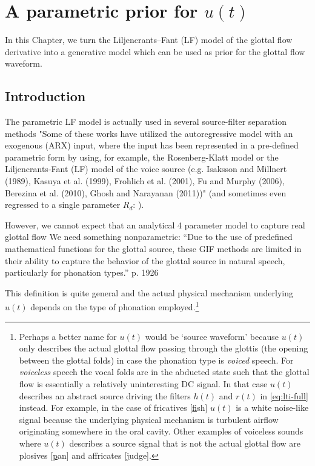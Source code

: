 \chapter{A parametric prior for $u(t)$\label{chapter:2}}

\begin{chaptersections}{%
In this Chapter, we turn the Liljencrants–Fant (LF) model of the glottal flow derivative into a generative model which can be used as prior for the glottal flow waveform.
}

\section{Introduction}

The parametric LF model is actually used in several source-filter separation methods \citep{Schleusing2012}
"Some of these works have utilized the autoregressive model
with an exogenous (ARX) input, where the input has been represented in
a pre-defined parametric form by using, for example, the Rosenberg-Klatt
model or the Liljencrants-Fant (LF) model of the voice source (e.g. Isaksson
and Millnert (1989), Kasuya et al. (1999), Frohlich et al. (2001), Fu and
Murphy (2006), Berezina et al. (2010), Ghosh and Narayanan (2011))" \citep{Drugman2019, Alzamendi2017}
(and sometimes even regressed to a single parameter $R_d$: \citep{Degottex2010}).

However, we cannot expect that an analytical 4 parameter model to capture real glottal flow
We need something nonparametric:
``Due to the
use of predefined mathematical functions for the glottal
source, these GIF methods are limited in their ability
to capture the behavior of the glottal source in natural
speech, particularly for phonation types.'' \citep{Kadiri2021} p. 1926

This definition is quite general and the actual physical mechanism underlying $u(t)$ depends on the type of phonation employed.\footnote{%
	Perhaps a better name for $u(t)$ would be `source waveform' because $u(t)$ only describes the actual glottal flow passing through the glottis (the opening between the glottal folds) in case the phonation type is \emph{voiced} speech. %
	For \emph{voiceless} speech the vocal folds are in the abducted state such that the glottal flow is essentially a relatively uninteresting DC signal.
	In that case $u(t)$ describes an abstract source driving the filters $h(t)$ and $r(t)$ in \eqref{eq:lti-full} instead.
	For example, in the case of fricatives [\underline{f}ish] $u(t)$ is a white noise-like signal because the underlying physical mechanism is turbulent airflow originating somewhere in the oral cavity.
	Other examples of voiceless sounds where $u(t)$ describes a source signal that is not the actual glottal flow are plosives [\underline{p}an] and affricates [\underline{j}udge].
} %



\end{chaptersections}
